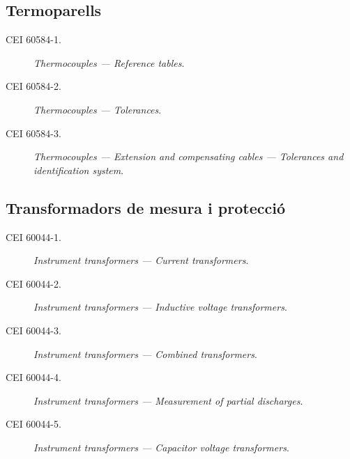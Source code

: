 \subsection*{Termoparells} 
\begin{description}
    \item [\hspace{5mm}CEI 60584-1.] \textit{Thermocouples --- Reference tables}.
    \item [\hspace{5mm}CEI 60584-2.] \textit{Thermocouples --- Tolerances}.
    \item [\hspace{5mm}CEI 60584-3.] \textit{Thermocouples --- Extension and compensating cables --- Tolerances and identification system}.
\end{description}


\subsection*{Transformadors de mesura i protecció}
\begin{description}
    \item [\hspace{5mm}CEI 60044-1.] \textit{Instrument transformers --- Current transformers}.
    \item [\hspace{5mm}CEI 60044-2.] \textit{Instrument transformers --- Inductive voltage transformers}.
    \item [\hspace{5mm}CEI 60044-3.] \textit{Instrument transformers --- Combined transformers}.
    \item [\hspace{5mm}CEI 60044-4.] \textit{Instrument transformers --- Measurement of partial discharges}.
    \item [\hspace{5mm}CEI 60044-5.] \textit{Instrument transformers --- Capacitor voltage transformers}.
\end{description}


